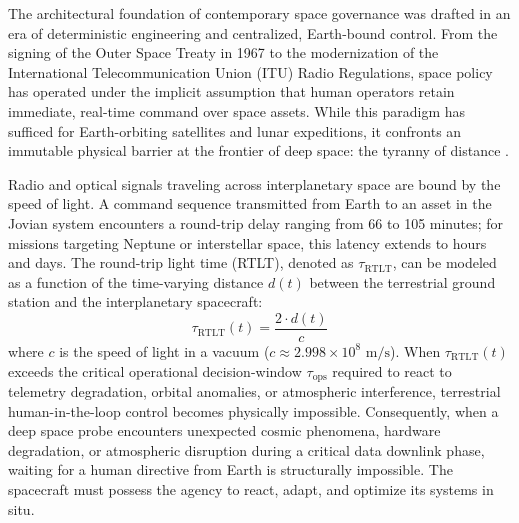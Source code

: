 \documentclass[final,5p,times,twocolumn]{elsarticle}
\begin{document}
The architectural foundation of contemporary space governance was drafted in an era of deterministic engineering and centralized, Earth-bound control. From the signing of the Outer Space Treaty in 1967 to the modernization of the International Telecommunication Union (ITU) Radio Regulations, space policy has operated under the implicit assumption that human operators retain immediate, real-time command over space assets. While this paradigm has sufficed for Earth-orbiting satellites and lunar expeditions, it confronts an immutable physical barrier at the frontier of deep space: the tyranny of distance \citep{shaw2020light}.

Radio and optical signals traveling across interplanetary space are bound by the speed of light. A command sequence transmitted from Earth to an asset in the Jovian system encounters a round-trip delay ranging from 66 to 105 minutes; for missions targeting Neptune or interstellar space, this latency extends to hours and days. The round-trip light time (RTLT), denoted as $\tau_{\text{RTLT}}$, can be modeled as a function of the time-varying distance $d(t)$ between the terrestrial ground station and the interplanetary spacecraft:
\begin{equation}
\tau_{\text{RTLT}}(t) = \frac{2 \cdot d(t)}{c}
\label{eq:latency}
\end{equation}
where $c$ is the speed of light in a vacuum ($c \approx 2.998 \times 10^8 \text{ m/s}$). When $\tau_{\text{RTLT}}(t)$ exceeds the critical operational decision-window $\tau_{\text{ops}}$ required to react to telemetry degradation, orbital anomalies, or atmospheric interference, terrestrial human-in-the-loop control becomes physically impossible. Consequently, when a deep space probe encounters unexpected cosmic phenomena, hardware degradation, or atmospheric disruption during a critical data downlink phase, waiting for a human directive from Earth is structurally impossible. The spacecraft must possess the agency to react, adapt, and optimize its systems in situ.
\end{document}
